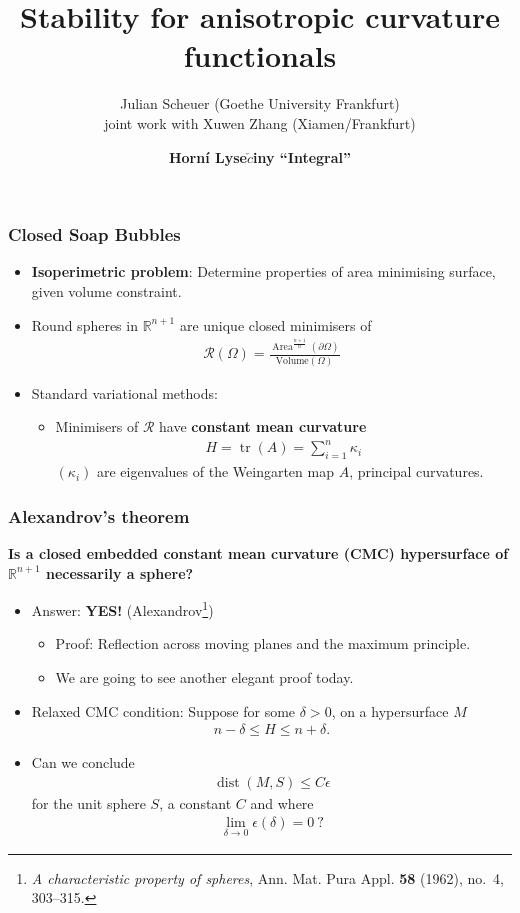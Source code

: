 \documentclass{beamer}
\title[Stability for anisotropic energies]{Stability for anisotropic curvature functionals}
\author[J. Scheuer]{Julian Scheuer (Goethe University Frankfurt) \\ joint work with Xuwen Zhang (Xiamen/Frankfurt)
\vspace{-0.5cm}
}
\date[Horní Lyse$\check{c}$iny, 09/12/23]{{\bf{Horní Lyse$\check{c}$iny ``Integral''}}
}
\newcommand{\bbR}{\mathbb{R}}
\newcommand{\8}{\infty}
\newcommand{\de}{\delta}
\newcommand{\ep}{\epsilon}
\newcommand{\ka}{\kappa}
\newcommand{\Om}{\Omega}
\newcommand{\cR}{\mathcal{R}}
\newcommand{\del}{\partial}
\newcommand{\fr}[2]{\frac{#1}{#2}}
\DeclareMathOperator{\dist}{dist}
\DeclareMathOperator{\tr}{tr}
\DeclareMathOperator{\Area}{Area}
\newcommand{\eq}[1]{\begin{equation}\begin{alignedat}{2} #1 \end{alignedat}\end{equation}}
\newcommand{\ra}{\rightarrow}
\newcommand{\mrm}{\mathrm}
\begin{document}
\maketitle



\begin{frame} 
\frametitle{Closed Soap Bubbles}

\begin{itemize}
		\item[] {\textbf{Isoperimetric problem}}: Determine properties of area minimising surface, given volume constraint. 
		\item[] Round spheres in $\bbR^{n+1}$ are unique closed minimisers of
		\eq{\cR(\Om) = \frac{\Area^{\fr{n+1}{n}}(\del\Om)}{\mrm{Volume}(\Om)}}
 	\item[] Standard variational methods:
	\begin{itemize}
	\item Minimisers of $\cR$ have {\bf{constant mean curvature}} 
	\eq{H=\tr(A) = \sum_{i=1}^{n}\ka_{i}}
	$(\ka_{i})$ are eigenvalues of the Weingarten map $A$, principal curvatures.
	\end{itemize}
\end{itemize}	
\end{frame}

\begin{frame} 
\frametitle{Alexandrov's theorem}

\begin{center}
{\textbf{Is a closed embedded constant mean curvature (CMC) hypersurface of $\bbR^{n+1}$ necessarily a sphere? }}
\end{center}


\begin{itemize}
\item[] Answer: {\textbf{YES!} (Alexandrov\footnote{\emph{A characteristic property of spheres}, Ann. Mat.
  Pura Appl. \textbf{58} (1962), no.~4, 303--315.})}
	\begin{itemize}
		\item Proof: Reflection across moving planes and the maximum principle.
		\item We are going to see another elegant proof today. 
	\end{itemize}
\item[] Relaxed CMC condition: Suppose for some $\de>0$, on a hypersurface $M$
\eq{n-\de\leq H\leq n+\de.}
\item[] Can we conclude
\eq{\dist(M,S)\leq C\ep}
for the unit sphere $S$, a constant $C$ and where 
\eq{\lim_{\de\ra 0}\ep(\de)= 0~?}
\end{itemize}
\end{frame}
\end{document}
